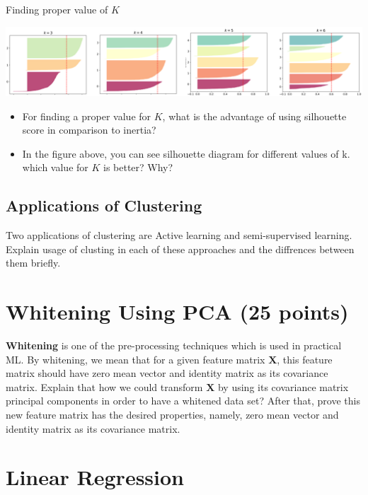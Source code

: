 \documentclass[a4paper]{article}
\begin{document}
        \begin{subsection}{Finding proper value of $K$}
        \begin{center}
         \includegraphics[scale=0.25]{Q1_B}
        \end{center}
        \begin{itemize}
        \item For finding a proper value for $K$, what is the advantage of using silhouette score in comparison to inertia?
        \item In the figure above, you can see silhouette diagram for different values of k. which value for $K$ is better? Why?
        \end{itemize}
        \subsection{Applications of Clustering}
        Two applications of clustering are Active learning and semi-supervised learning. Explain usage of clusting in each of these approaches and the diffrences between them briefly.
        \end{subsection}
        \bigskip
    
        
        \section{Whitening Using PCA (25 points)}
        \textbf{Whitening} is one of the pre-processing techniques which is used in practical ML. By whitening, we mean that for a given feature matrix $\mathbf{X}$, this feature matrix should have zero mean vector and identity matrix as its covariance matrix. Explain that how we could transform $\mathbf{X}$ by using its covariance matrix principal components in order to have a whitened data set? After that, prove this new feature matrix has the desired properties, namely, zero mean vector and identity matrix as its covariance matrix.
        \bigskip
    
        
        \section{Linear Regression}
\end{document}
